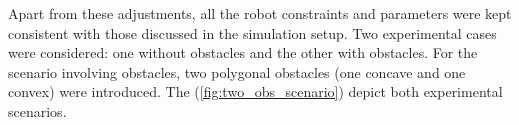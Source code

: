 

\vspace*{6mm}   


Apart from these adjustments, all the robot constraints and parameters were kept consistent with those discussed in the simulation setup. Two experimental cases were considered: one without obstacles and the other with obstacles. For the scenario involving obstacles, two polygonal obstacles (one concave and one convex) were introduced. The (\autoref{fig:two_obs_scenario}) depict both experimental scenarios. 




